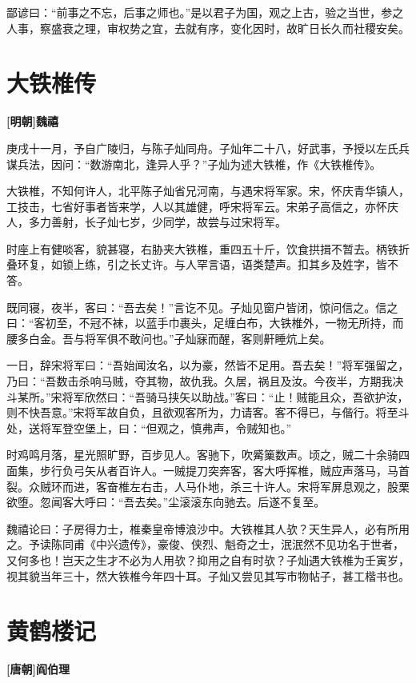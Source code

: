 \documentclass[UTF8,titlepage,oneside]{ctexbook}
\begin{document}
鄙谚曰：“前事之不忘，后事之师也。”是以君子为国，观之上古，验之当世，参之人事，察盛衰之理，审权势之宜，去就有序，变化因时，故旷日长久而社稷安矣。



\chapter*{大铁椎传}
\begin{center}
	\textbf{[明朝]魏禧}
\end{center}

庚戌十一月，予自广陵归，与陈子灿同舟。子灿年二十八，好武事，予授以左氏兵谋兵法，因问：“数游南北，逢异人乎？”子灿为述大铁椎，作《大铁椎传》。

大铁椎，不知何许人，北平陈子灿省兄河南，与遇宋将军家。宋，怀庆青华镇人，工技击，七省好事者皆来学，人以其雄健，呼宋将军云。宋弟子高信之，亦怀庆人，多力善射，长子灿七岁，少同学，故尝与过宋将军。

时座上有健啖客，貌甚寝，右胁夹大铁椎，重四五十斤，饮食拱揖不暂去。柄铁折叠环复，如锁上练，引之长丈许。与人罕言语，语类楚声。扣其乡及姓字，皆不答。

既同寝，夜半，客曰：“吾去矣！”言讫不见。子灿见窗户皆闭，惊问信之。信之曰：“客初至，不冠不袜，以蓝手巾裹头，足缠白布，大铁椎外，一物无所持，而腰多白金。吾与将军俱不敢问也。”子灿寐而醒，客则鼾睡炕上矣。

一日，辞宋将军曰：“吾始闻汝名，以为豪，然皆不足用。吾去矣！”将军强留之，乃曰：“吾数击杀响马贼，夺其物，故仇我。久居，祸且及汝。今夜半，方期我决斗某所。”宋将军欣然曰：“吾骑马挟矢以助战。”客曰：“止！贼能且众，吾欲护汝，则不快吾意。”宋将军故自负，且欲观客所为，力请客。客不得已，与偕行。将至斗处，送将军登空堡上，曰：“但观之，慎弗声，令贼知也。”

时鸡鸣月落，星光照旷野，百步见人。客驰下，吹觱篥数声。顷之，贼二十余骑四面集，步行负弓矢从者百许人。一贼提刀突奔客，客大呼挥椎，贼应声落马，马首裂。众贼环而进，客奋椎左右击，人马仆地，杀三十许人。宋将军屏息观之，股栗欲堕。忽闻客大呼曰：“吾去矣。”尘滚滚东向驰去。后遂不复至。

魏禧论曰：子房得力士，椎秦皇帝博浪沙中。大铁椎其人欤？天生异人，必有所用之。予读陈同甫《中兴遗传》，豪俊、侠烈、魁奇之士，泯泯然不见功名于世者，又何多也！岂天之生才不必为人用欤？抑用之自有时欤？子灿遇大铁椎为壬寅岁，视其貌当年三十，然大铁椎今年四十耳。子灿又尝见其写市物帖子，甚工楷书也。


\chapter*{黄鹤楼记}
\begin{center}
	\textbf{[唐朝]阎伯理}
\end{center}
\end{document}
